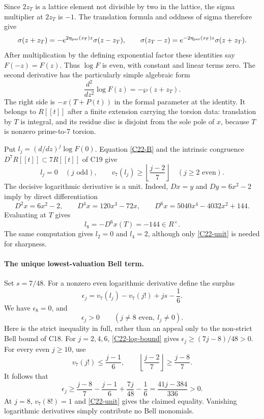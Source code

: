 \documentclass[11pt]{article}
\theoremstyle{definition}\newtheorem{definition}[theorem]{Definition}\newtheorem{remark}[theorem]{Remark}
\begin{document}
Since $2z_T$ is a lattice element not divisible by two in the
lattice, the sigma multiplier at $2z_T$ is $-1$.
The translation formula and oddness of sigma therefore give
\[
 \sigma(z+z_T)
     =-e^{2\eta_{\rm per}(z_T)z}\sigma(z-z_T),
 \qquad
 \sigma(z_T-z)
     =e^{-2\eta_{\rm per}(z_T)z}\sigma(z+z_T).
\]
After multiplication by the defining exponential factor these
identities say $F(-z)=F(z)$.  Thus $\log F$ is even, with
constant and linear terms zero.
The second derivative has the particularly simple algebraic form
\begin{equation}\label{C22-B}
 \frac{d^2}{dz^2}\log F(z)=-\wp(z+z_T).
\end{equation}
The right side is $-x(T+P(t))$ in the formal parameter at the
identity.  It belongs to $R[[t]]$ after a finite extension
carrying the torsion data: translation by $T$ is integral,
and its residue disc is disjoint from the sole pole of $x$,
because $T$ is nonzero prime-to-7 torsion.

Put $l_j=(d/dz)^j\log F(0)$.  Equation \eqref{C22-B}
and the intrinsic congruence $D^7R[[t]]\subset7R[[t]]$ of
C19 give
\begin{equation}\label{C22-log-bound}
 l_j=0\quad(j\text{ odd}),\qquad
 v_7(l_j)\geq\left\lfloor\frac{j-2}{7}\right\rfloor
       \quad(j\geq2\text{ even}).
\end{equation}
The decisive logarithmic derivative is a unit.  Indeed,
$Dx=y$ and $Dy=6x^2-2$ imply by direct differentiation
\[
 D^2x=6x^2-2,\qquad
 D^4x=120x^3-72x,\qquad
 D^6x=5040x^4-4032x^2+144.
\]
Evaluating at $T$ gives
\begin{equation}\label{C22-unit}
 l_8=-D^6x(T)=-144\in R^\times.
\end{equation}
The same computation gives $l_2=0$ and $l_4=2$, although
only \eqref{C22-unit} is needed for sharpness.

\paragraph{The unique lowest-valuation Bell term.}
Set $s=7/48$.  For a nonzero even logarithmic derivative
define the surplus
\[
 \epsilon_j=v_7(l_j)-v_7(j!)+js-\frac16.
\]
We have $\epsilon_8=0$, and
\begin{equation}\label{C22-strict}
 \epsilon_j>0\qquad(j\ne8\text{ even},\ l_j\ne0).
\end{equation}
Here is the strict inequality in full, rather than an appeal
only to the non-strict Bell bound of C18.
For $j=2,4,6$, \eqref{C22-log-bound} gives
$\epsilon_j\geq(7j-8)/48>0$.
For every even $j\geq10$, use
\[
 v_7(j!)\leq\frac{j-1}{6},\qquad
 \left\lfloor\frac{j-2}{7}\right\rfloor
       \geq\frac{j-8}{7}.
\]
It follows that
\[
 \epsilon_j\geq
   \frac{j-8}{7}-\frac{j-1}{6}
          +\frac{7j}{48}-\frac16
      =\frac{41j-384}{336}>0.
\]
At $j=8$, $v_7(8!)=1$ and \eqref{C22-unit} gives the
claimed equality.  Vanishing logarithmic derivatives simply
contribute no Bell monomials.
\end{document}
